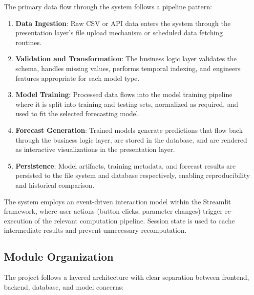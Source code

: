 The primary data flow through the system follows a pipeline pattern:

\begin{enumerate}
    \item \textbf{Data Ingestion}: Raw CSV or API data enters the system through the presentation layer's file upload mechanism or scheduled data fetching routines.
    
    \item \textbf{Validation and Transformation}: The business logic layer validates the schema, handles missing values, performs temporal indexing, and engineers features appropriate for each model type.
    
    \item \textbf{Model Training}: Processed data flows into the model training pipeline where it is split into training and testing sets, normalized as required, and used to fit the selected forecasting model.
    
    \item \textbf{Forecast Generation}: Trained models generate predictions that flow back through the business logic layer, are stored in the database, and are rendered as interactive visualizations in the presentation layer.
    
    \item \textbf{Persistence}: Model artifacts, training metadata, and forecast results are persisted to the file system and database respectively, enabling reproducibility and historical comparison.
\end{enumerate}

The system employs an event-driven interaction model within the Streamlit framework, where user actions (button clicks, parameter changes) trigger re-execution of the relevant computation pipeline. Session state is used to cache intermediate results and prevent unnecessary recomputation.

\subsection{Module Organization}

The project follows a layered architecture with clear separation between frontend, backend, database, and model concerns:

